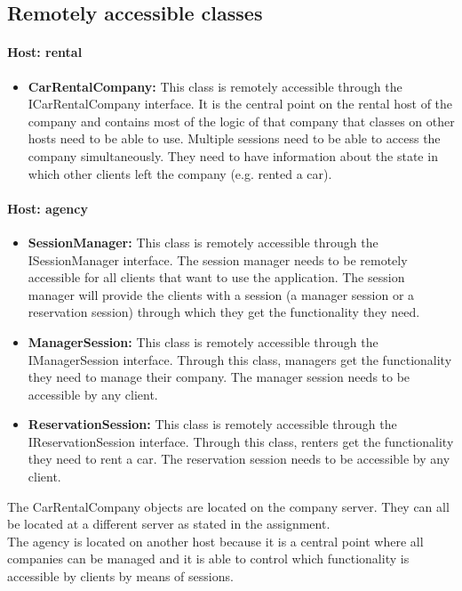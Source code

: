 \documentclass[10pt,a4paper]{report}
\begin{document}
\subsection{Remotely accessible classes}


\paragraph{Host: rental}
\begin{itemize}
\item \textbf{CarRentalCompany:} This class is remotely accessible through the ICarRentalCompany interface. It is the central point on the rental host of the company and contains most of the logic of that company that classes on other hosts need to be able to use. Multiple sessions need to be able to access the company simultaneously. They need to have information about the state in which other clients left the company (e.g. rented a car).
\end{itemize}

\paragraph{Host: agency}
\begin{itemize}
\item \textbf{SessionManager:} This class is remotely accessible through the ISessionManager interface. The session manager needs to be remotely accessible for all clients that want to use the application. The session manager will provide the clients with a session (a manager session or a reservation session) through which they get the functionality they need.
\item \textbf{ManagerSession:} This class is remotely accessible through the IManagerSession interface. Through this class, managers get the functionality they need to manage their company. The manager session needs to be accessible by any client.
\item \textbf{ReservationSession:} This class is remotely accessible through the IReservationSession interface. Through this class, renters get the functionality they need to rent a car. The reservation session needs to be accessible by any client.
\end{itemize}

The CarRentalCompany objects are located on the company server. They can all be located at a different server as stated in the assignment.\\
The agency is located on another host because it is a central point where all companies can be managed and  it is able to control which functionality is accessible by clients by means of sessions.\\
\end{document}
